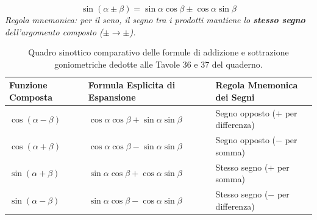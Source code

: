 \documentclass[11pt,a4paper,oneside]{report}
\renewcommand{\arraystretch}{1.4}
\begin{document}
\begin{metodo}
\begin{equation}
    \sin(\alpha \pm \beta) = \sin\alpha\cos\beta \pm \cos\alpha\sin\beta
\end{equation}
\textit{Regola mnemonica: per il seno, il segno tra i prodotti mantiene lo \textbf{stesso segno} dell'argomento composto ($\pm \to \pm$).}
\end{metodo}

\begin{table}[htbp]
\centering
\small
\renewcommand{\arraystretch}{1.4}
\begin{tabularx}{\textwidth}{p{3.9cm}Xp{4.8cm}}
\toprule
\textbf{Funzione Composta} & \textbf{Formula Esplicita di Espansione} & \textbf{Regola Mnemonica dei Segni} \\
\midrule
$\cos(\alpha - \beta)$ & $\cos\alpha\cos\beta + \sin\alpha\sin\beta$ & Segno opposto ($+$ per differenza) \\
$\cos(\alpha + \beta)$ & $\cos\alpha\cos\beta - \sin\alpha\sin\beta$ & Segno opposto ($-$ per somma) \\
$\sin(\alpha + \beta)$ & $\sin\alpha\cos\beta + \cos\alpha\sin\beta$ & Stesso segno ($+$ per somma) \\
$\sin(\alpha - \beta)$ & $\sin\alpha\cos\beta - \cos\alpha\sin\beta$ & Stesso segno ($-$ per differenza) \\
\bottomrule
\end{tabularx}
\caption{Quadro sinottico comparativo delle formule di addizione e sottrazione goniometriche dedotte alle Tavole 36 e 37 del quaderno.}
\label{tab:formule_addizione_sottrazione_4b}
\end{table}
\end{document}
